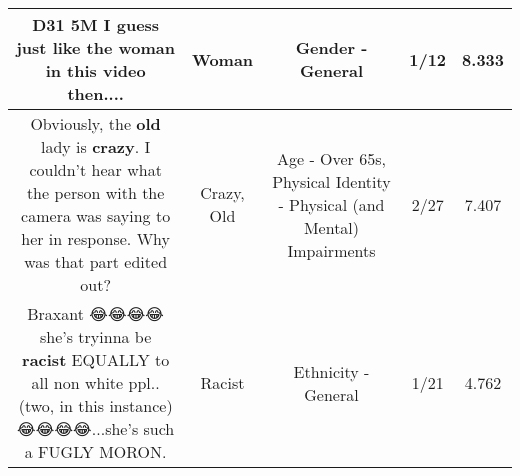 \documentclass[11pt]{article}
\newlength\mylength
\begin{document}
\begin{center}
\begin{longtable}{|C{.65\mylength}|C{.30\mylength}|C{.12\mylength}|C{.12\mylength}|C{.12\mylength}|}
  \small D31 5M I guess just like the \textbf{woman} in this video then....\normalsize   & Woman & Gender - General & 1/12 & 8.333 \\  \hline
  \small Obviously, the \textbf{old} lady is \textbf{crazy}.  I couldn't hear what the person with the camera was saying to her in response.  Why was that part edited out?\normalsize   & Crazy, Old & Age - Over 65s, Physical Identity - Physical (and Mental) Impairments & 2/27 & 7.407 \\  \hline
  \small Braxant 😂😂😂😂she's tryinna be \textbf{racist} EQUALLY to all non white ppl.. (two, in this instance) 😂😂😂😂...she's such a FUGLY MORON.\normalsize   & Racist & Ethnicity - General & 1/21 & 4.762 \\  \hline
  
\end{longtable}
\end{center}
\end{document}
